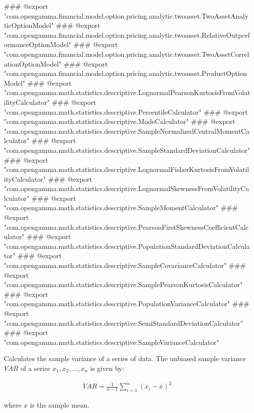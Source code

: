 ### @export "com.opengamma.financial.model.option.pricing.analytic.twoasset.TwoAssetAnalyticOptionModel"
### @export "com.opengamma.financial.model.option.pricing.analytic.twoasset.RelativeOutperformanceOptionModel"
### @export "com.opengamma.financial.model.option.pricing.analytic.twoasset.TwoAssetCorrelationOptionModel"
### @export "com.opengamma.financial.model.option.pricing.analytic.twoasset.ProductOptionModel"
### @export "com.opengamma.math.statistics.descriptive.LognormalPearsonKurtosisFromVolatilityCalculator"
### @export "com.opengamma.math.statistics.descriptive.PercentileCalculator"
### @export "com.opengamma.math.statistics.descriptive.ModeCalculator"
### @export "com.opengamma.math.statistics.descriptive.SampleNormalizedCentralMomentCalculator"
### @export "com.opengamma.math.statistics.descriptive.SampleStandardDeviationCalculator"
### @export "com.opengamma.math.statistics.descriptive.LognormalFisherKurtosisFromVolatilityCalculator"
### @export "com.opengamma.math.statistics.descriptive.LognormalSkewnessFromVolatilityCalculator"
### @export "com.opengamma.math.statistics.descriptive.SampleMomentCalculator"
### @export "com.opengamma.math.statistics.descriptive.PearsonFirstSkewnessCoefficientCalculator"
### @export "com.opengamma.math.statistics.descriptive.PopulationStandardDeviationCalculator"
### @export "com.opengamma.math.statistics.descriptive.SampleCovarianceCalculator"
### @export "com.opengamma.math.statistics.descriptive.SamplePearsonKurtosisCalculator"
### @export "com.opengamma.math.statistics.descriptive.PopulationVarianceCalculator"
### @export "com.opengamma.math.statistics.descriptive.SemiStandardDeviationCalculator"
### @export "com.opengamma.math.statistics.descriptive.SampleVarianceCalculator"

Calculates the sample variance of a series of data. The unbiased sample variance $VAR$ of a series $x_1, x_2, \dots, x_n$ is given by:

\begin{eqnarray*}
VAR = \frac{1}{n-1}\sum\limits_{i=1}^{n}(x_i - \overline{x})^2
\end{eqnarray*}

where $\overline{x}$ is the sample mean.

